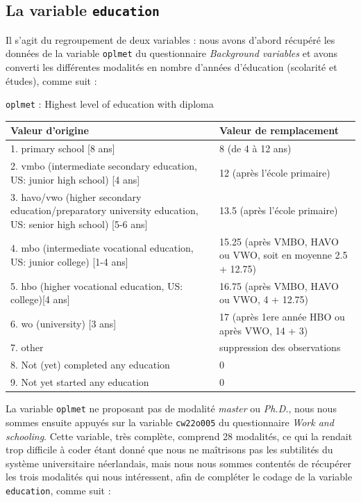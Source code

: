 \documentclass[a4paper, french, 11 pt]{article}\usepackage[]{graphicx}\usepackage[]{xcolor}
\begin{document}
\subsection{La variable \texttt{education}}

Il s'agit du regroupement de deux variables : nous avons d'abord récupéré les données de la variable \texttt{oplmet} du questionnaire \textit{Background variables} et avons converti les différentes modalités en nombre d'années d'éducation (scolarité et études), comme suit : 

\vspace{0,5cm}
\begin{minipage}{0,8\linewidth}
{\footnotesize\texttt{oplmet} : Highest level of education with diploma
\vspace{0,2cm}

\begin{tabular}{m{0,5\linewidth}m{0,5\linewidth}}
\hline
Valeur d'origine & Valeur de remplacement \\
\hline
1. primary school [8 ans] & 8 (de 4 à 12 ans) \\
2. vmbo (intermediate secondary education, US: junior high school) [4 ans] & 12 (après l'école primaire) \\
3. havo/vwo (higher secondary education/preparatory university education, US: senior high school) [5-6 ans] & 13.5 (après l'école primaire) \\
4. mbo (intermediate vocational education, US: junior college) [1-4 ans] & 15.25 (après VMBO, HAVO ou VWO, soit en moyenne 2.5 + 12.75)\\
5. hbo (higher vocational education, US: college)[4 ans] & 16.75 (après VMBO, HAVO ou VWO, 4 + 12.75)\\
6. wo (university) [3 ans]& 17 (après 1ere année HBO ou après VWO, 14 + 3)\\
7. other & suppression des observations \\
8. Not (yet) completed any education & 0 \\
9. Not yet started any education & 0 \\
\hline
\end{tabular}}
\end{minipage}
\vspace{0,3cm}

La variable \texttt{oplmet} ne proposant pas de modalité \textit{master} ou \textit{Ph.D.}, nous nous sommes ensuite appuyés sur la variable \texttt{cw22o005} du questionnaire \textit{Work and schooling}. Cette variable, très complète, comprend 28 modalités, ce qui la rendait trop difficile à coder étant donné que nous ne maîtrisons pas les subtilités du système universitaire néerlandais, mais nous nous sommes contentés de récupérer les trois modalités qui nous intéressent, afin de compléter le codage de la variable \texttt{education}, comme suit : 
\end{document}
